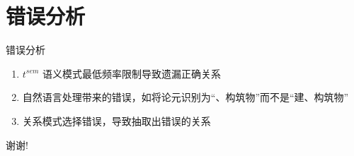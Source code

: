 ﻿\documentclass[12pt]{ctexbeamer}	%
\begin{document}
\section{错误分析}

\begin{frame}{错误分析}
  \begin{enumerate}
    \item $t^{sem}$ 语义模式最低频率限制导致遗漏正确关系
    \item 自然语言处理带来的错误，如将论元识别为“、构筑物”而不是“建、构筑物”
    \item 关系模式选择错误，导致抽取出错误的关系
  \end{enumerate}
\end{frame}



\begin{frame}
\centerline{\Large 谢谢!}
\end{frame}
\end{document}

